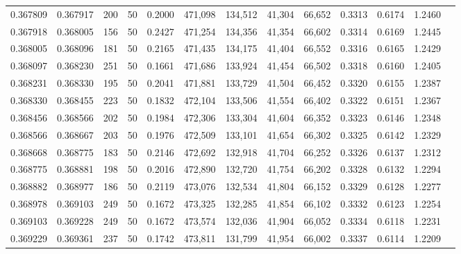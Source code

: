 \begin{tabular}{rrrrrrrrrrrrr}
0.367809 & 0.367917 &   200 &  50 &                                     0.2000 & 471,098 & 134,512 &  41,304 &  66,652 & 0.3313 & 0.6174 & 1.2460 \\
0.367918 & 0.368005 &   156 &  50 &                                     0.2427 & 471,254 & 134,356 &  41,354 &  66,602 & 0.3314 & 0.6169 & 1.2445 \\
0.368005 & 0.368096 &   181 &  50 &                                     0.2165 & 471,435 & 134,175 &  41,404 &  66,552 & 0.3316 & 0.6165 & 1.2429 \\
0.368097 & 0.368230 &   251 &  50 &                                     0.1661 & 471,686 & 133,924 &  41,454 &  66,502 & 0.3318 & 0.6160 & 1.2405 \\
0.368231 & 0.368330 &   195 &  50 &                                     0.2041 & 471,881 & 133,729 &  41,504 &  66,452 & 0.3320 & 0.6155 & 1.2387 \\
0.368330 & 0.368455 &   223 &  50 &                                     0.1832 & 472,104 & 133,506 &  41,554 &  66,402 & 0.3322 & 0.6151 & 1.2367 \\
0.368456 & 0.368566 &   202 &  50 &                                     0.1984 & 472,306 & 133,304 &  41,604 &  66,352 & 0.3323 & 0.6146 & 1.2348 \\
0.368566 & 0.368667 &   203 &  50 &                                     0.1976 & 472,509 & 133,101 &  41,654 &  66,302 & 0.3325 & 0.6142 & 1.2329 \\
0.368668 & 0.368775 &   183 &  50 &                                     0.2146 & 472,692 & 132,918 &  41,704 &  66,252 & 0.3326 & 0.6137 & 1.2312 \\
0.368775 & 0.368881 &   198 &  50 &                                     0.2016 & 472,890 & 132,720 &  41,754 &  66,202 & 0.3328 & 0.6132 & 1.2294 \\
0.368882 & 0.368977 &   186 &  50 &                                     0.2119 & 473,076 & 132,534 &  41,804 &  66,152 & 0.3329 & 0.6128 & 1.2277 \\
0.368978 & 0.369103 &   249 &  50 &                                     0.1672 & 473,325 & 132,285 &  41,854 &  66,102 & 0.3332 & 0.6123 & 1.2254 \\
0.369103 & 0.369228 &   249 &  50 &                                     0.1672 & 473,574 & 132,036 &  41,904 &  66,052 & 0.3334 & 0.6118 & 1.2231 \\
0.369229 & 0.369361 &   237 &  50 &                                     0.1742 & 473,811 & 131,799 &  41,954 &  66,002 & 0.3337 & 0.6114 & 1.2209 \\

\end{tabular}
